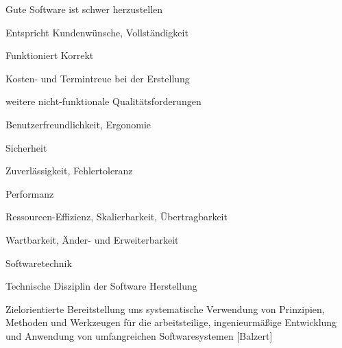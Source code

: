 \documentclass[a4paper]{article}
\begin{document}
\raggedright
\begin{multicols}{3}\scriptsize
  \setlength{\premulticols}{1pt}
  \setlength{\postmulticols}{1pt}
  \setlength{\multicolsep}{1pt}
  \setlength{\columnsep}{2pt}

  Gute Software ist schwer herzustellen
  \begin{itemize*}
    \item Entspricht Kundenwünsche, Vollständigkeit
    \item Funktioniert Korrekt
    \item Kosten- und Termintreue bei der Erstellung
    \item weitere nicht-funktionale Qualitätsforderungen
          \begin{itemize*}
            \item Benutzerfreundlichkeit, Ergonomie
            \item Sicherheit
            \item Zuverlässigkeit, Fehlertoleranz
            \item Performanz
            \item Ressourcen-Effizienz, Skalierbarkeit, Übertragbarkeit
            \item Wartbarkeit, Änder- und Erweiterbarkeit
          \end{itemize*}
  \end{itemize*}

  Softwaretechnik
  \begin{itemize*}
    \item Technische Disziplin der Software Herstellung
    \item Zielorientierte Bereitstellung uns systematische Verwendung von Prinzipien, Methoden und Werkzeugen für die arbeitsteilige, ingenieurmäßige Entwicklung und Anwendung von umfangreichen Softwaresystemen [Balzert]
  \end{itemize*}


\end{multicols}
\end{document}
